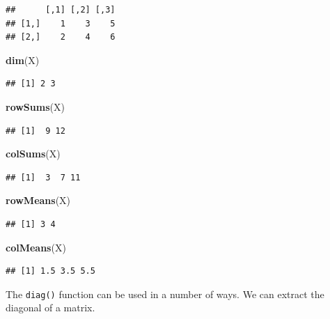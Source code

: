 \documentclass[]{book}
\newenvironment{Shaded}{\begin{snugshade}}{\end{snugshade}}
\newcommand{\KeywordTok}[1]{\textcolor[rgb]{0.13,0.29,0.53}{\textbf{#1}}}
\newcommand{\NormalTok}[1]{#1}
\theoremstyle{definition}
\theoremstyle{definition}
\theoremstyle{definition}
\theoremstyle{remark}
\begin{document}
\begin{verbatim}
##      [,1] [,2] [,3]
## [1,]    1    3    5
## [2,]    2    4    6
\end{verbatim}

\begin{Shaded}
\begin{Highlighting}[]
\KeywordTok{dim}\NormalTok{(X)}
\end{Highlighting}
\end{Shaded}

\begin{verbatim}
## [1] 2 3
\end{verbatim}

\begin{Shaded}
\begin{Highlighting}[]
\KeywordTok{rowSums}\NormalTok{(X)}
\end{Highlighting}
\end{Shaded}

\begin{verbatim}
## [1]  9 12
\end{verbatim}

\begin{Shaded}
\begin{Highlighting}[]
\KeywordTok{colSums}\NormalTok{(X)}
\end{Highlighting}
\end{Shaded}

\begin{verbatim}
## [1]  3  7 11
\end{verbatim}

\begin{Shaded}
\begin{Highlighting}[]
\KeywordTok{rowMeans}\NormalTok{(X)}
\end{Highlighting}
\end{Shaded}

\begin{verbatim}
## [1] 3 4
\end{verbatim}

\begin{Shaded}
\begin{Highlighting}[]
\KeywordTok{colMeans}\NormalTok{(X)}
\end{Highlighting}
\end{Shaded}

\begin{verbatim}
## [1] 1.5 3.5 5.5
\end{verbatim}

The \texttt{diag()} function can be used in a number of ways. We can
extract the diagonal of a matrix.
\end{document}
